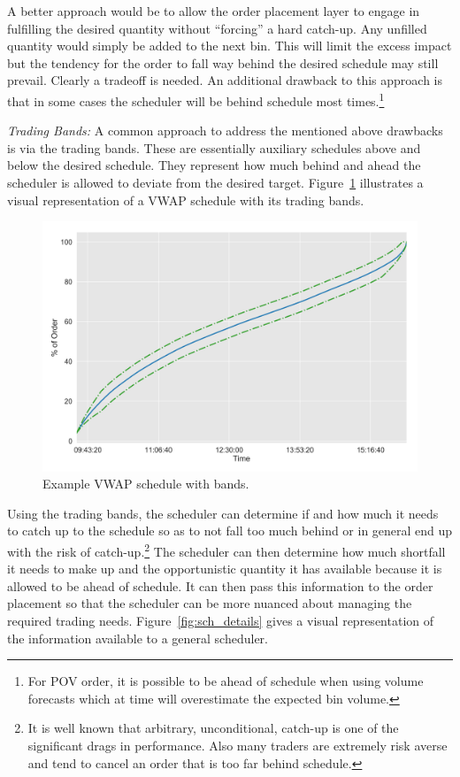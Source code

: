 A better approach would be to allow the order placement layer to engage in fulfilling the desired quantity without ``forcing'' a hard catch-up. Any unfilled quantity would simply be added to the next bin. This will limit the excess impact but the tendency for the order to fall way behind the desired schedule may still prevail. Clearly a tradeoff is needed. An additional drawback to this approach is that in some cases the scheduler will be behind schedule most times.\footnote{For POV order, it is possible to be ahead of schedule when using volume forecasts which at time will overestimate the expected bin volume.} \twomedskip


\noindent\emph{Trading Bands:} A common approach to address the mentioned above drawbacks is via the trading bands. These are essentially auxiliary schedules above and below the desired schedule. They represent how much behind and ahead the scheduler is allowed to deviate from the desired target. Figure~\ref{fig:schedule} illustrates a visual representation of a VWAP schedule with its trading bands. 

	\begin{figure}[!ht]
	\centering
	\includegraphics[width=\textwidth]{chapters/chapter_exec_models/figures/schedule.png} 
	\caption{Example VWAP schedule with bands. \label{fig:schedule}}
	\end{figure}

Using the trading bands, the scheduler can determine if and how much it needs to catch up to the schedule so as to not fall too much behind or in general end up with the risk of catch-up.\footnote{It is well known that arbitrary, unconditional, catch-up is one of the significant drags in performance. Also many traders are extremely risk averse and tend to cancel an order that is too far behind schedule.} The scheduler can then determine how much shortfall it needs to make up and the opportunistic quantity it has available because it is allowed to be ahead of schedule. It can then pass this information to the order placement so that the scheduler can be more nuanced about managing the required trading needs. Figure~\ref{fig:sch_details} gives a visual representation of the information available to a general scheduler.

